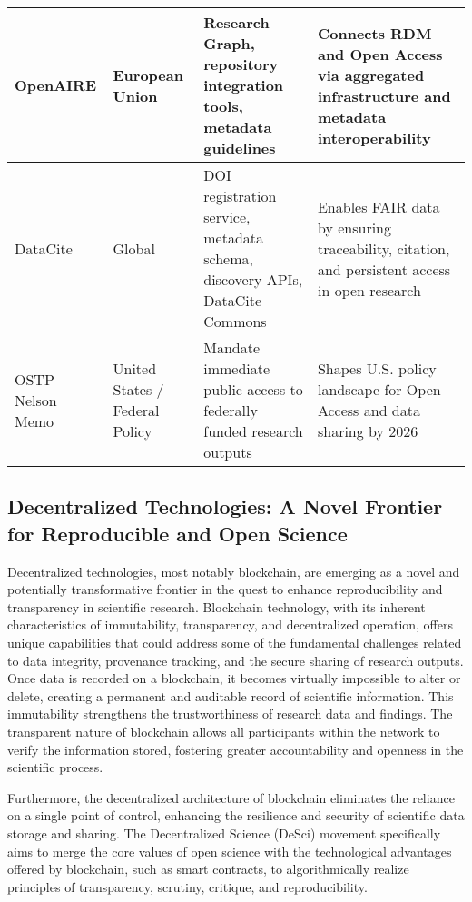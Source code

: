 \documentclass{article}
\begin{document}
\begin{table}[H]
{\begin{tabular}{|p{3.5cm}|p{4cm}|p{5cm}|p{5cm}|}
            OpenAIRE                           & European Union                              & Research Graph, repository integration tools, metadata guidelines           & Connects RDM and Open Access via aggregated infrastructure and metadata interoperability     \\
            \hline
            DataCite                           & Global                                      & DOI registration service, metadata schema, discovery APIs, DataCite Commons & Enables FAIR data by ensuring traceability, citation, and persistent access in open research \\
            \hline
            OSTP Nelson Memo                   & United States / Federal Policy              & Mandate immediate public access to federally funded research outputs        & Shapes U.S. policy landscape for Open Access and data sharing by 2026                        \\
            \hline
        \end{tabular}%
    }
\end{table}



\subsection{Decentralized Technologies: A Novel Frontier for Reproducible and Open Science}

Decentralized technologies, most notably blockchain, are emerging as a novel and potentially transformative frontier in the quest to enhance reproducibility and transparency in scientific research. Blockchain technology, with its inherent characteristics of immutability, transparency, and decentralized operation, offers unique capabilities that could address some of the fundamental challenges related to data integrity, provenance tracking, and the secure sharing of research outputs. Once data is recorded on a blockchain, it becomes virtually impossible to alter or delete, creating a permanent and auditable record of scientific information. This immutability strengthens the trustworthiness of research data and findings. The transparent nature of blockchain allows all participants within the network to verify the information stored, fostering greater accountability and openness in the scientific process.

Furthermore, the decentralized architecture of blockchain eliminates the reliance on a single point of control, enhancing the resilience and security of scientific data storage and sharing. The Decentralized Science (DeSci) movement specifically aims to merge the core values of open science with the technological advantages offered by blockchain, such as smart contracts, to algorithmically realize principles of transparency, scrutiny, critique, and reproducibility.
\end{document}
